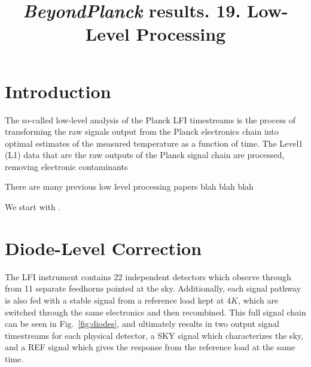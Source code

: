 \documentclass[twocolumn]{aa}
\begin{document}
\title{\textit{BeyondPlanck} results. 19. Low-Level Processing}




\maketitle



\section{Introduction}
\label{sec:introduction}

The so-called low-level analysis of the Planck LFI timestreams is the process of transforming the raw signals output from the Planck electronics chain into optimal estimates of the measured temperature as a function of time. The Level1 (L1) data that are the raw outputs of the Planck signal chain are processed, removing electronic contaminants 

There are many previous low level processing papers blah blah blah

We start with \citet{planck2016-l01}. 

\section{Diode-Level Correction}

The LFI instrument contains 22 independent detectors which observe through from 11 separate feedhorns pointed at the sky. Additionally, each signal pathway is also fed with a stable signal from a reference load kept at 4$K$, which are switched through the same electronics and then recombined. This full signal chain can be seen in Fig.~\ref{fig:diodes}, and ultimately results in two output signal timestreams for each physical detector, a SKY signal which characterizes the sky, and a REF signal which gives the response from the reference load at the same time.
\end{document}
